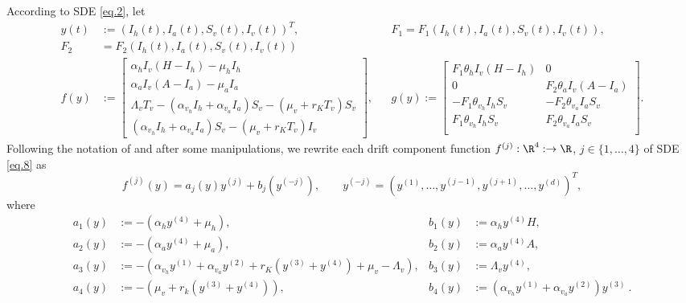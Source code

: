 	According to SDE \eqref{eq.2}, let 
%
\begin{equation*} \label{eqn:SDE_coefficients}
	\begin{aligned}
			y(t)&:=(I_h(t),I_a(t),S_v(t),I_v(t))^T,
			&&
			F_{1} = 
				F_{1}
					\left(
						I_{h}(t),I_{a}(t),S_{v}(t),I_{v}(t)
					\right),
			\\
			F_{2} &=
				F_{2}
					\left(
						I_{h}(t),I_{a}(t),S_{v}(t),I_{v}(t)
					\right)
			\\
			f(y) &:= 
			\begin{bmatrix} 
				\alpha_{h}I_{v}\left(H-I_{h}\right)-\mu_{h}I_{h} \\
				\alpha_{a}I_{v}\left(A-I_{a}\right)-\mu_{a}I_{a} \\
				\Lambda_{v}T_{v}
				-\left(
					\alpha_{v_{h}}I_{h}
					+\alpha_{v_{a}} I_{a}
				\right)S_{v}
				-\left(
					\mu_{v}+r_{K}T_{v}
				\right)S_{v}\\
				\left(
					\alpha_{v_{h}}I_{h}+\alpha_{v_{a}}I_{a}
				\right)
				S_{v}
				-\left(
					\mu_{v}+r_{K}T_{v}
				\right)I_{v}
			\end{bmatrix}, 
			&&
			g(y):=
			\begin{bmatrix}
				F_{1}\theta_{h}I_{v}\left(H-I_{h}\right) & 0 \\
				0 & F_{2}\theta_{a}I_{v}\left(A-I_{a}\right) \\
				- F_{1}\theta_{v_{h}}I_{h}S_{v} & -F_{2}\theta_{v_{a}}I_{a}S_{v} \\
				F_{1}\theta_{v_{h}}I_{h}S_{v} & F_{2}\theta_{v_{a}}I_{a}S_{v} \\
			\end{bmatrix}.
	\end{aligned}
\end{equation*}
	Following the notation of \cite{Diaz-Infante2016} and 
after some manipulations, we rewrite each drift
component  function $f^{(j)}:\R^4:\to \R$, 
$j \in \{1,\dots, 4\}$ of SDE \eqref{eq.8} as
\begin{equation*}\label{eqn:AlternativeConstruction}
	f^{(j)}(y) = a_j (y) y^{(j)} + b_{j}(y^{(-j)}), \qquad
	y^{(-j)} = 
		(y^{(1)}, 
			\dots , y^{(j-1)}, y^{(j+1)}, 
			\dots, y^{(d)}
		)^T,
\end{equation*}
where
\begin{align*}
	a_1(y)&:=
		-\left(
			\alpha_{h} y^{(4)} +\mu_{h}
		\right),
	&
	b_1(y)&:= 
		\alpha_h  y^{(4)} H ,
	\\
	a_2(y) &:=
		-
		\left(
			\alpha_{a} y^{(4)}+\mu_{a}
		\right),
	&
	b_2(y)&:= 
		\alpha_a  y^{(4)} A ,
	\\
	a_3(y) &:=
		-
		\left( 
			 \alpha_{v_{h}} y^{(1)}
			+ \alpha_{v_{a}} y^{(2)}
			+ r_K (y^{(3)} + y^{(4)})
			+\mu_v
			- \Lambda_v
		\right),
	&
	b_3(y)&:= 
		\Lambda_{v} y^{(4)},
		\\
	a_4(y) &:=
		-
		\left(
			\mu_{v}
			+r_k
			\left(
				y^{(3)} + y^{(4)}
			\right)
		\right),
		&
	b_4(y) &:=
		\left(
			\alpha_{v_h} y^{(1)}
			+
			\alpha_{v_{a}} y^{(2)}
		\right)
		y^{(3)} ~.
\end{align*}

